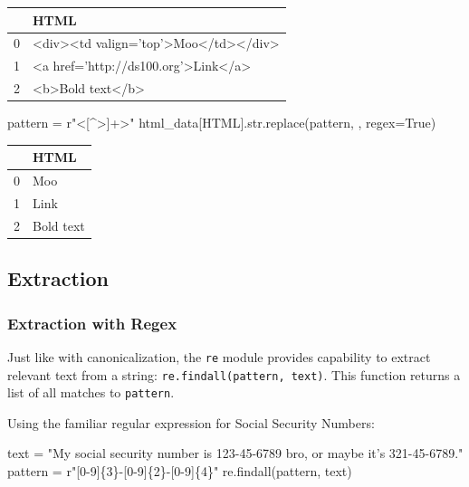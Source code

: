 \documentclass[
  letterpaper,
  DIV=11,
  numbers=noendperiod]{scrreprt}
\newenvironment{Shaded}{\begin{snugshade}}{\end{snugshade}}
\newcommand{\BuiltInTok}[1]{\textcolor[rgb]{0.00,0.23,0.31}{#1}}
\newcommand{\NormalTok}[1]{\textcolor[rgb]{0.00,0.23,0.31}{#1}}
\newcommand{\OperatorTok}[1]{\textcolor[rgb]{0.37,0.37,0.37}{#1}}
\newcommand{\SpecialCharTok}[1]{\textcolor[rgb]{0.37,0.37,0.37}{#1}}
\newcommand{\StringTok}[1]{\textcolor[rgb]{0.13,0.47,0.30}{#1}}
\newcommand{\VariableTok}[1]{\textcolor[rgb]{0.07,0.07,0.07}{#1}}
\newcommand{\VerbatimStringTok}[1]{\textcolor[rgb]{0.13,0.47,0.30}{#1}}
\begin{document}
\begin{tabular}{ll}
\toprule
{} &                                  HTML \\
\midrule
0 &  <div><td valign='top'>Moo</td></div> \\
1 &   <a href='http://ds100.org'>Link</a> \\
2 &                      <b>Bold text</b> \\
\bottomrule
\end{tabular}

\begin{Shaded}
\begin{Highlighting}[]
\NormalTok{pattern }\OperatorTok{=} \VerbatimStringTok{r"\textless{}[\^{}\textgreater{}]+\textgreater{}"}
\NormalTok{html\_data[}\StringTok{\textquotesingle{}HTML\textquotesingle{}}\NormalTok{].}\BuiltInTok{str}\NormalTok{.replace(pattern, }\StringTok{\textquotesingle{}\textquotesingle{}}\NormalTok{, regex}\OperatorTok{=}\VariableTok{True}\NormalTok{)}
\end{Highlighting}
\end{Shaded}

\begin{tabular}{ll}
\toprule
{} &       HTML \\
\midrule
0 &        Moo \\
1 &       Link \\
2 &  Bold text \\
\bottomrule
\end{tabular}

\hypertarget{extraction-1}{%
\subsection{Extraction}\label{extraction-1}}

\hypertarget{extraction-with-regex}{%
\subsubsection{Extraction with Regex}\label{extraction-with-regex}}

Just like with canonicalization, the \texttt{re} module provides
capability to extract relevant text from a string:
\texttt{re.findall(pattern,\ text)}. This function returns a list of all
matches to \texttt{pattern}.

Using the familiar regular expression for Social Security Numbers:

\begin{Shaded}
\begin{Highlighting}[]
\NormalTok{text }\OperatorTok{=} \StringTok{"My social security number is 123{-}45{-}6789 bro, or maybe it’s 321{-}45{-}6789."}
\NormalTok{pattern }\OperatorTok{=} \VerbatimStringTok{r"[0{-}9]}\SpecialCharTok{\{3\}}\VerbatimStringTok{{-}[0{-}9]}\SpecialCharTok{\{2\}}\VerbatimStringTok{{-}[0{-}9]}\SpecialCharTok{\{4\}}\VerbatimStringTok{"}
\NormalTok{re.findall(pattern, text)  }
\end{Highlighting}
\end{Shaded}
\end{document}
